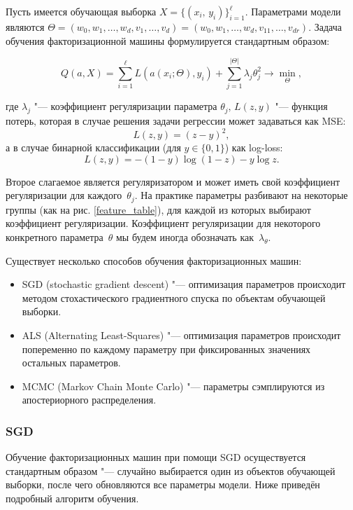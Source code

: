 \documentclass[12pt,a4paper]{article}
\begin{document}
Пусть имеется обучающая выборка $X = \{ \left(x_i, \, y_i\right)\}_{i=1}^\ell.$ Параметрами модели являются $\Theta = \left(w_0, w_1, \dots, w_d, v_1, \dots, v_d \right)  = \left(w_0, w_1, \dots, w_d, v_{11}, \dots, v_{dr} \right).$  Задача обучения факторизационной машины формулируется стандартным образом:

\begin{equation}
    Q(a, X) = \sum_{i=1}^\ell L(a(x_i; \Theta), y_i) + \sum_{j = 1}^{|\Theta|} \lambda_j \theta_j^2 \to \min_{\Theta},
\end{equation}

где $\lambda_j$ "--- коэффициент регуляризации параметра $\theta_j, \, L(z, y)$ "--- функция потерь, которая в случае решения задачи регрессии может задаваться как MSE:
\begin{equation*}
	L(z, y) = (z - y)^2,
\end{equation*}
а в случае бинарной классификации (для $y \in \{0, 1\}$) как log-loss:
\begin{equation*}
	L(z, y) = - (1-y)\log(1-z) - y\log z.
\end{equation*}

Второе слагаемое является регуляризатором и может иметь свой коэффициент регуляризации для каждого~$\theta_j$. На практике параметры разбивают на некоторые группы (как на рис. \ref{feature_table}), для каждой из которых выбирают коэффициент регуляризации.
Коэффициент регуляризации для некоторого конкретного параметра~$\theta$ мы будем иногда обозначать как~$\lambda_\theta$.

Существует несколько способов обучения факторизационных машин:
\begin{itemize}
	\item SGD (stochastic gradient descent) "--- оптимизация параметров происходит методом стохастического градиентного спуска по объектам обучающей выборки.
	\item ALS (Alternating Least-Squares) "--- оптимизация параметров происходит попеременно по каждому параметру при фиксированных значениях остальных параметров.
	\item MCMC (Markov Chain Monte Carlo) "--- параметры сэмплируются из апостериорного распределения.
\end{itemize}

\subsubsection{SGD}

Обучение факторизационных машин при помощи SGD осуществуется стандартным образом "--- случайно выбирается один из объектов обучающей выборки, после чего обновляются все параметры модели. Ниже приведён подробный алгоритм обучения.
\end{document}
